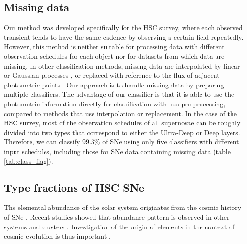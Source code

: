 \documentclass[proof]{pasj01}
\providecommand{\DIFadd}[1]{{\protect\color{blue} \sf #1}} %
\providecommand{\DIFdel}[1]{{\protect\color{red} \scriptsize #1}} %
\providecommand{\DIFaddbegin}{\protect\color{blue}} %
\providecommand{\DIFaddend}{\protect\color{black}} %
\providecommand{\DIFdelbegin}{\protect\color{red}} %
\providecommand{\DIFdelend}{\protect\color{black}} %
\newcommand{\DIFscaledelfig}{0.5}
\newlength{\DIFdelgraphicswidth} %
\newlength{\DIFdelgraphicsheight} %
\newcommand{\DIFaddincludegraphics}[2][]{{\color{blue}\fbox{\DIFOincludegraphics[#1]{#2}}}} %
\newcommand{\DIFdelincludegraphics}[2][]{%
\sbox{\DIFdelgraphicsbox}{\DIFOincludegraphics[#1]{#2}}%
\settoboxwidth{\DIFdelgraphicswidth}{\DIFdelgraphicsbox} %
\settoboxtotalheight{\DIFdelgraphicsheight}{\DIFdelgraphicsbox} %
\scalebox{\DIFscaledelfig}{%
\parbox[b]{\DIFdelgraphicswidth}{\usebox{\DIFdelgraphicsbox}\\[-\baselineskip] \rule{\DIFdelgraphicswidth}{0em}}\llap{\resizebox{\DIFdelgraphicswidth}{\DIFdelgraphicsheight}{%
\setlength{\unitlength}{\DIFdelgraphicswidth}%
\begin{picture}(1,1)%
\thicklines\linethickness{2pt} %
{\color[rgb]{1,0,0}\put(0,0){\framebox(1,1){}}}%
{\color[rgb]{1,0,0}\put(0,0){\line( 1,1){1}}}%
{\color[rgb]{1,0,0}\put(0,1){\line(1,-1){1}}}%
\end{picture}%
}\hspace*{3pt}}} %
} %
\DeclareRobustCommand{\DIFaddbegin}{\DIFOaddbegin \let\includegraphics\DIFaddincludegraphics} %
\DeclareRobustCommand{\DIFaddend}{\DIFOaddend \let\includegraphics\DIFOincludegraphics} %
\DeclareRobustCommand{\DIFdelbegin}{\DIFOdelbegin \let\includegraphics\DIFdelincludegraphics} %
\DeclareRobustCommand{\DIFdelend}{\DIFOaddend \let\includegraphics\DIFOincludegraphics} %
\begin{document}
\subsection{Missing data}
%
Our method was developed specifically for the HSC survey, where each observed transient tends to have the same cadence by observing a certain field repeatedly.
However, this method is neither suitable for processing data with different observation schedules for each object nor for datasets from which data are missing.
In other classification methods, missing data are interpolated by linear or Gaussian processes \citep{Lochner_2016,Muthukrishna_2019}, or replaced with reference to the flux of adjacent photometric points \citep{charnock17a}.
Our approach is to handle missing data by preparing multiple classifiers.
The advantage of our classifier is that it is able to use the photometric information directly for classification with less pre-processing, compared to methods that use interpolation or replacement.
In the case of the HSC survey, most of the observation schedules of all supernovae can be roughly divided into two types that correspond to either the Ultra-Deep or Deep layers.
Therefore, we can classify 99.3\% of SNe using only five classifiers with different input schedules, including those for SNe data containing missing data (table \ref{tab:class_flag}).
%
%
\subsection{Type fractions of HSC SNe}
The elemental abundance of the solar system \citep{grevesse98a} originates from the cosmic history of SNe \citep{maraston05a,kobayashi00a}.  
Recent studies showed that \DIFdelbegin \DIFdel{the solar }\DIFdelend \DIFaddbegin \DIFadd{this elemental }\DIFaddend abundance pattern is observed in other systems \citep{ramirez09a} and clusters \citep{mernier18a}. 
Investigation of the origin of elements in the context of cosmic evolution is thus important \citep{fukugita04a}. 
\end{document}
